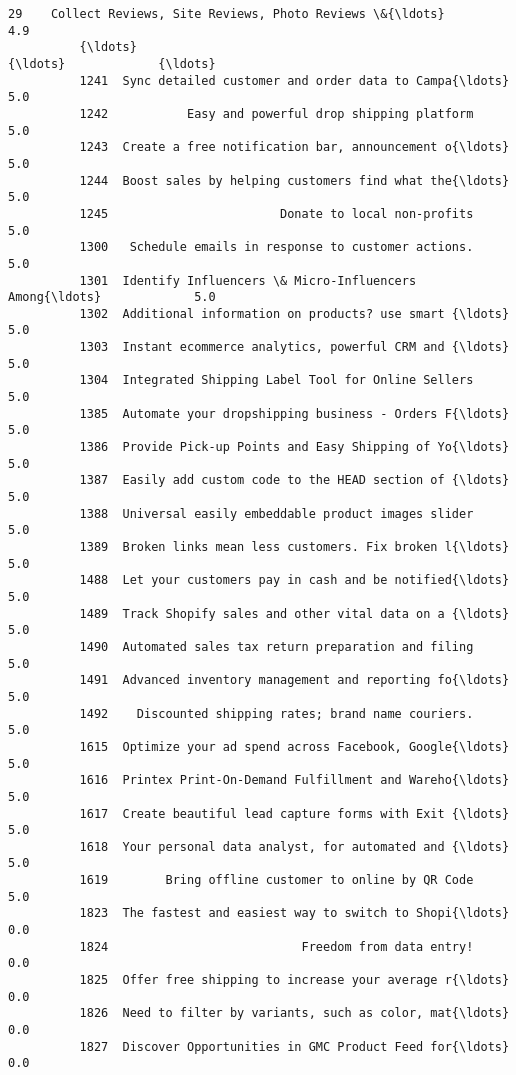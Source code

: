 \documentclass[11pt]{article}
\begin{document}
\begin{Verbatim}[commandchars=\\\{\}]
          29    Collect Reviews, Site Reviews, Photo Reviews \&{\ldots}             4.9   
          {\ldots}                                                 {\ldots}             {\ldots}   
          1241  Sync detailed customer and order data to Campa{\ldots}             5.0   
          1242           Easy and powerful drop shipping platform             5.0   
          1243  Create a free notification bar, announcement o{\ldots}             5.0   
          1244  Boost sales by helping customers find what the{\ldots}             5.0   
          1245                        Donate to local non-profits             5.0   
          1300   Schedule emails in response to customer actions.             5.0   
          1301  Identify Influencers \& Micro-Influencers Among{\ldots}             5.0   
          1302  Additional information on products? use smart {\ldots}             5.0   
          1303  Instant ecommerce analytics, powerful CRM and {\ldots}             5.0   
          1304  Integrated Shipping Label Tool for Online Sellers             5.0   
          1385  Automate your dropshipping business - Orders F{\ldots}             5.0   
          1386  Provide Pick-up Points and Easy Shipping of Yo{\ldots}             5.0   
          1387  Easily add custom code to the HEAD section of {\ldots}             5.0   
          1388  Universal easily embeddable product images slider             5.0   
          1389  Broken links mean less customers. Fix broken l{\ldots}             5.0   
          1488  Let your customers pay in cash and be notified{\ldots}             5.0   
          1489  Track Shopify sales and other vital data on a {\ldots}             5.0   
          1490  Automated sales tax return preparation and filing             5.0   
          1491  Advanced inventory management and reporting fo{\ldots}             5.0   
          1492    Discounted shipping rates; brand name couriers.             5.0   
          1615  Optimize your ad spend across Facebook, Google{\ldots}             5.0   
          1616  Printex Print-On-Demand Fulfillment and Wareho{\ldots}             5.0   
          1617  Create beautiful lead capture forms with Exit {\ldots}             5.0   
          1618  Your personal data analyst, for automated and {\ldots}             5.0   
          1619        Bring offline customer to online by QR Code             5.0   
          1823  The fastest and easiest way to switch to Shopi{\ldots}             0.0   
          1824                           Freedom from data entry!             0.0   
          1825  Offer free shipping to increase your average r{\ldots}             0.0   
          1826  Need to filter by variants, such as color, mat{\ldots}             0.0   
          1827  Discover Opportunities in GMC Product Feed for{\ldots}             0.0   
          

\end{Verbatim}
\end{document}
